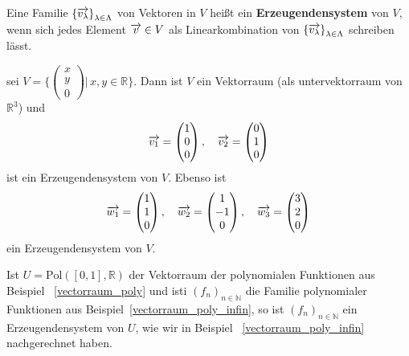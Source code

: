 \begin{definition} Eine Familie  $\left\{ \overrightarrow{v_{\lambda}} \right\}_{\lambda \in \Lambda}$ von 
Vektoren in $V$ heißt ein \textbf{Erzeugendensystem} 
von $V$, wenn sich jedes Element $\overrightarrow{v} \in V$ als 
Linearkombination von $\left\{ \overrightarrow{v_{\lambda}} \right\}_{\lambda \in \Lambda}$ schreiben lässt.
\end{definition}

\begin{beispiel} sei $V = \{ \left( \begin{smallmatrix} x \\ y \\ 0 \end{smallmatrix} \right) \vert \, x, y 
\in \mathbb R \}$. Dann ist $V$ ein Vektorraum (als untervektorraum von $\mathbb R^3$) und 
  	$$ \overrightarrow{v_1} = \left( \begin{matrix} 1 \\ 0 \\ 0 \end{matrix} \right), \quad
   	\overrightarrow{v_2} = \left( \begin{matrix} 0 \\ 1 \\ 0 \end{matrix} \right) $$
ist ein Erzeugendensystem von $V$. Ebenso ist 
  	$$ \overrightarrow{w_1} = \left( \begin{matrix} 1 \\ 1 \\ 0 \end{matrix} \right), \quad
	\overrightarrow{w_2} = \left( \begin{matrix} 1 \\ -1 \\ 0 \end{matrix} \right), \quad
  	\overrightarrow{w_3} = \left( \begin{matrix} 3 \\ 2 \\ 0 \end{matrix} \right) $$
ein Erzeugendensystem von $V$. 
\end{beispiel}

\begin{beispiel}\label{vectorraum_poly_erz} Ist $U = \textrm{Pol}([0,1], \mathbb R)$ der Vektorraum der 
polynomialen Funktionen aus Beispiel ~\ref{vectorraum_poly} und isti $\left( f_{n} \right)_{n \in \mathbb N}$
die Familie polynomialer Funktionen aus Beispiel~\ref{vectorraum_poly_infin}, so ist 
$\left( f_{n} \right)_{n \in \mathbb N}$ ein Erzeugendensystem von $U$, wie wir in Beispiel 
~\ref{vectorraum_poly_infin} nachgerechnet haben.
\end{beispiel}

